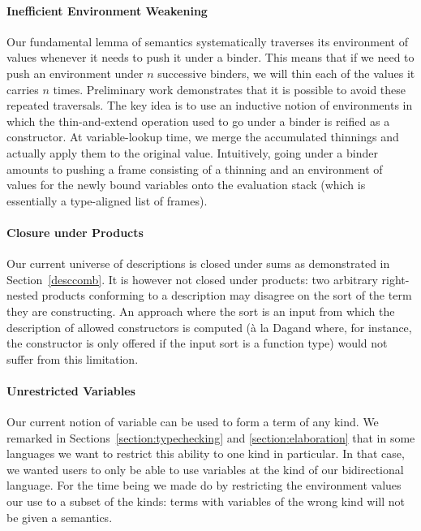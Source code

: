 \paragraph{Inefficient Environment Weakening} Our fundamental lemma of
semantics systematically traverses its environment of values whenever it
needs to push it under a binder. This means that if we need to push an
environment under $n$ successive binders, we will thin each of the values
it carries $n$ times.
%
Preliminary work demonstrates that it is possible to avoid these repeated
traversals. The key idea is to use an inductive notion of environments in
which the thin-and-extend operation used to go under a binder is reified
as a constructor. At variable-lookup time, we merge the accumulated
thinnings and actually apply them to the original value.
%
Intuitively, going under a binder amounts to pushing a frame consisting of
a thinning and an environment of values for the newly bound variables onto
the evaluation stack (which is essentially a type-aligned list of frames).


\paragraph{Closure under Products} Our current universe of descriptions is
closed under sums as demonstrated in Section~\ref{desccomb}. It is however
not closed under products: two arbitrary right-nested products conforming
to a description may disagree on the sort of the term they are constructing.
An approach where the sort is an input from which the description of allowed
constructors is computed (à la Dagand \citeyear{DBLP:phd/ethos/Dagand13} where,
for instance, the  constructor is only offered if the input sort is
a function type) would not suffer from this limitation.

\paragraph{Unrestricted Variables} Our current notion of variable can be used
to form a term of any kind. We remarked in Sections~\ref{section:typechecking}
and \ref{section:elaboration} that in some languages we want to restrict this
ability to one kind in particular. In that case, we wanted users to only be able
to use variables at the kind  of our bidirectional language. For the
time being we made do by restricting the environment values our 
use to a subset of the kinds: terms with variables of the wrong kind will not be
given a semantics.

